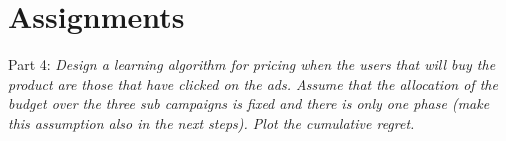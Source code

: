 \chapter{Assignments}

Part 4:
\textit{Design a learning algorithm for pricing when the users that will buy the product are those that have clicked on the ads. Assume that the allocation of the budget over the three sub campaigns is fixed and there is only one phase (make this assumption also in the next steps). Plot the cumulative regret.}\label{assPart4}